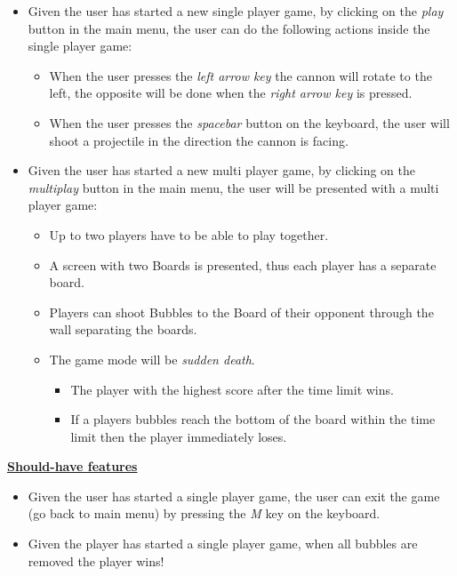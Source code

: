 \documentclass[a4paper,11pt]{article}
\begin{document}
\begin{itemize}
  \item Given the user has started a new single player game, by clicking on the \textit{play} button in the main menu, the user can do the following actions inside the single player game:
  \begin{itemize}
    \item When the user presses the \textit{left arrow key} the cannon will rotate to the left, the opposite will be done when the \textit{right arrow key} is pressed.
    \item When the user presses the \textit{spacebar} button on the keyboard, the user will shoot a projectile in the direction the cannon is facing.
  \end{itemize}

  \item Given the user has started a new multi player game, by clicking on the \textit{multiplay} button in the main menu, the user will be presented with a multi player game:
  \begin{itemize}
    \item Up to two players have to be able to play together.
    \item A screen with two Boards is presented, thus each player has a separate board.
    \item Players can shoot Bubbles to the Board of their opponent through the wall separating the boards.
    \item The game mode will be \textit{sudden death}.
    \begin{itemize}
      \item The player with the highest score after the time limit wins.
      \item If a players bubbles reach the bottom of the board within the time limit then the player immediately loses.
    \end{itemize}
  \end{itemize}
\end{itemize}

\newpage
\noindent
\textbf{\underline{Should-have features}}
\begin{itemize}
   \item Given the user has started a single player game, the user can exit the game (go back to main menu) by pressing the \textit{M} key on the keyboard.
   \item Given the player has started a single player game, when all bubbles are removed the player wins!
\end{itemize}
\end{document}
